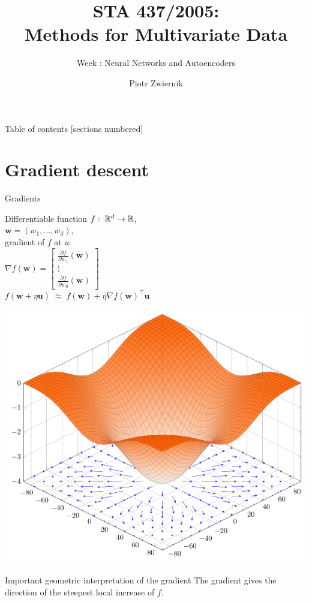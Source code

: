 \documentclass[handout,aspectratio=169]{beamer}
\title[STA414-Week \weeknum]{STA 437/2005: \\Methods for Multivariate Data}
\subtitle[]{Week \weeknum: Neural Networks and Autoencoders}
\author[Prob Learning]{{Piotr Zwiernik}}
\institute[UofT]{University of Toronto}
\date{}
\begin{document}
\maketitle

\begin{frame}{Table of contents}
  [sections numbered]
  \tableofcontents%
\end{frame}



\section{Gradient descent}

\begin{frame}{Gradients}
\begin{minipage}{6cm}
	Differentiable function $f:\;\mathbb R^d\to \mathbb R$,\\
	 $\mathbf w=(w_1,\ldots,w_d)$,\\
	\alert{gradient of $f$ at $w$}\\[.3cm]
	$\nabla f(\mathbf w)=\begin{bmatrix}
		\tfrac{\partial f}{\partial w_1}(\mathbf w)\\
		\vdots\\
		\tfrac{\partial f}{\partial w_d}(\mathbf w)
	\end{bmatrix}$\\[5mm]	
	$f(\mathbf w+\eta \mathbf u)\;\approx\; f(\mathbf w)+\eta \nabla f(\mathbf w)^\top \mathbf u$
\end{minipage}
\begin{minipage}{7cm}
	\includegraphics[scale=.3]{pics/gradient-cos.png}
\end{minipage}
\begin{alertblock}{Important geometric interpretation of the gradient}
	The gradient gives the direction of the steepest local increase of $f$.
\end{alertblock}


\end{frame}
\end{document}
